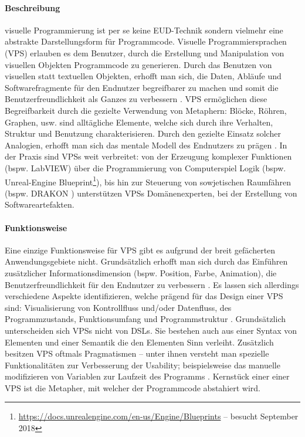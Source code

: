 \paragraph{Beschreibung} visuelle Programmierung ist per se keine \ac{EUD}-Technik sondern vielmehr eine abstrakte Darstellungsform für Programmcode. Visuelle Programmiersprachen (VPS)  erlauben es dem Benutzer, durch die Erstellung und Manipulation von visuellen Objekten Programmcode zu generieren. Durch das Benutzen von visuellen statt textuellen Objekten, erhofft man sich, die Daten, Abläufe und Softwarefragmente für den Endnutzer begreifbarer zu machen und somit die Benutzerfreundlichkeit als Ganzes zu verbessern \cite{burnett2002software}. \ac{VPS} ermöglichen diese Begreifbarkeit durch die gezielte Verwendung von Metaphern: Blöcke, Röhren, Graphen, usw. sind alltägliche Elemente, welche sich durch ihre Verhalten, Struktur und Benutzung charakterisieren. Durch den gezielte Einsatz solcher Analogien, erhofft man sich das mentale Modell des Endnutzers zu prägen \cite{Myers1986vis}. In der Praxis sind \acp{VPS} weit verbreitet: von der Erzeugung komplexer Funktionen (bspw. LabVIEW) über die Programmierung von Computerspiel Logik (bspw. Unreal-Engine Blueprint\footnote{\url{https://docs.unrealengine.com/en-us/Engine/Blueprints} -- besucht September 2018}), bis hin zur Steuerung von sowjetischen Raumfähren (bspw. DRAKON \cite{parondzhanov1995drakon}) unterstützen \acp{VPS} Domänenexperten, bei der Erstellung von Softwareartefakten. 

\paragraph{Funktionsweise} Eine einzige Funktionsweise für \ac{VPS} gibt es aufgrund der breit gefächerten Anwendungsgebiete nicht. Grundsätzlich erhofft man sich durch das Einführen zusätzlicher Informationsdimension (bspw. Position, Farbe, Animation), die Benutzerfreundlichkeit für den Endnutzer zu verbessern \cite{Myers1986vis}. Es lassen sich allerdings verschiedene Aspekte identifizieren, welche prägend für das Design einer \ac{VPS} sind: Visualisierung von Kontrollfluss und/oder Datenfluss, des Programmzustands, Funktionsumfang und Programmstruktur \cite{boshernitsan2004visual}. Grundsätzlich unterscheiden sich \acp{VPS} nicht von \acp{DSL}. Sie bestehen auch aus einer Syntax von Elementen und einer Semantik die den Elementen Sinn verleiht. Zusätzlich besitzen \ac{VPS} oftmals Pragmatismen -- unter ihnen versteht man spezielle Funktionalitäten zur Verbesserung der Usability; beispielsweise das manuelle modifizieren von Variablen zur Laufzeit des Programms \cite{Repenning2017MovingBS}. Kernstück einer einer \ac{VPS} ist die Metapher, mit welcher der Programmcode abstahiert wird. 


